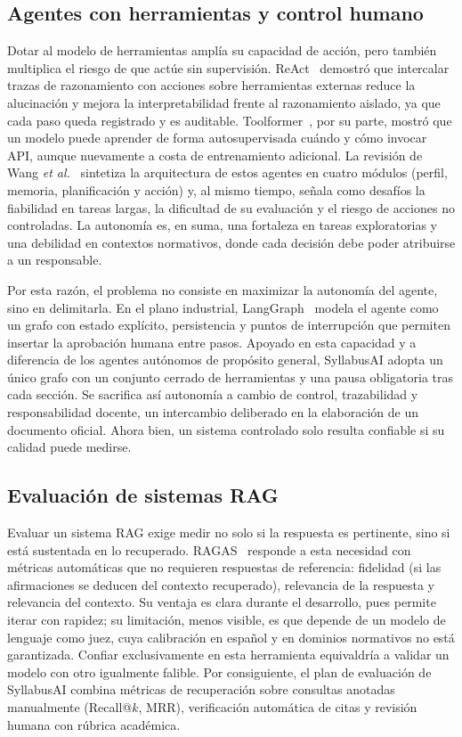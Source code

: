 \subsection{Agentes con herramientas y control humano}
Dotar al modelo de herramientas amplía su capacidad de acción, pero también multiplica el riesgo de que actúe sin supervisión. ReAct~\cite{yao2023react} demostró que intercalar trazas de razonamiento con acciones sobre herramientas externas reduce la alucinación y mejora la interpretabilidad frente al razonamiento aislado, ya que cada paso queda registrado y es auditable. Toolformer~\cite{schick2023toolformer}, por su parte, mostró que un modelo puede aprender de forma autosupervisada cuándo y cómo invocar API, aunque nuevamente a costa de entrenamiento adicional. La revisión de Wang \textit{et al.}~\cite{wang2024agentsurvey} sintetiza la arquitectura de estos agentes en cuatro módulos (perfil, memoria, planificación y acción) y, al mismo tiempo, señala como desafíos la fiabilidad en tareas largas, la dificultad de su evaluación y el riesgo de acciones no controladas. La autonomía es, en suma, una fortaleza en tareas exploratorias y una debilidad en contextos normativos, donde cada decisión debe poder atribuirse a un responsable.

Por esta razón, el problema no consiste en maximizar la autonomía del agente, sino en delimitarla. En el plano industrial, LangGraph~\cite{langgraph2024} modela el agente como un grafo con estado explícito, persistencia y puntos de interrupción que permiten insertar la aprobación humana entre pasos. Apoyado en esta capacidad y a diferencia de los agentes autónomos de propósito general, SyllabusAI adopta un único grafo con un conjunto cerrado de herramientas y una pausa obligatoria tras cada sección. Se sacrifica así autonomía a cambio de control, trazabilidad y responsabilidad docente, un intercambio deliberado en la elaboración de un documento oficial. Ahora bien, un sistema controlado solo resulta confiable si su calidad puede medirse.

\subsection{Evaluación de sistemas RAG}
Evaluar un sistema RAG exige medir no solo si la respuesta es pertinente, sino si está sustentada en lo recuperado. RAGAS~\cite{es2024ragas} responde a esta necesidad con métricas automáticas que no requieren respuestas de referencia: fidelidad (si las afirmaciones se deducen del contexto recuperado), relevancia de la respuesta y relevancia del contexto. Su ventaja es clara durante el desarrollo, pues permite iterar con rapidez; su limitación, menos visible, es que depende de un modelo de lenguaje como juez, cuya calibración en español y en dominios normativos no está garantizada. Confiar exclusivamente en esta herramienta equivaldría a validar un modelo con otro igualmente falible. Por consiguiente, el plan de evaluación de SyllabusAI combina métricas de recuperación sobre consultas anotadas manualmente (Recall@$k$, MRR), verificación automática de citas y revisión humana con rúbrica académica.

